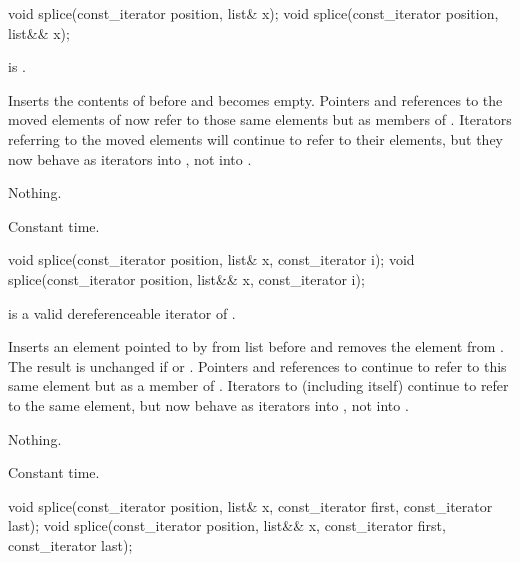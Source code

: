 %
\begin{itemdecl}
void splice(const_iterator position, list& x);
void splice(const_iterator position, list&& x);
\end{itemdecl}

\begin{itemdescr}
\pnum
\expects
{} is .

\pnum
\effects
Inserts the contents of
before
and
becomes empty.
Pointers and references to the moved elements of
now refer to those same elements but as members of
.
Iterators referring to the moved elements will continue to refer to their
elements, but they now behave as iterators into
,
not into
.

\pnum
\throws
Nothing.

\pnum
\complexity
Constant time.
\end{itemdescr}

%
\begin{itemdecl}
void splice(const_iterator position, list& x, const_iterator i);
void splice(const_iterator position, list&& x, const_iterator i);
\end{itemdecl}

\begin{itemdescr}
\pnum
\expects
{} is a valid dereferenceable iterator of .

\pnum
\effects
Inserts an element pointed to by
from list
before  and removes the element from
.
The result is unchanged if
or
.
Pointers and references to
continue to refer to this same element but as a member of
.
Iterators
to
(including
itself) continue to refer to the same element, but now behave as iterators into
,
not into
.

\pnum
\throws
Nothing.

\pnum
\complexity
Constant time.
\end{itemdescr}

%
\begin{itemdecl}
void splice(const_iterator position, list& x, const_iterator first,
            const_iterator last);
void splice(const_iterator position, list&& x, const_iterator first,
            const_iterator last);
\end{itemdecl}

